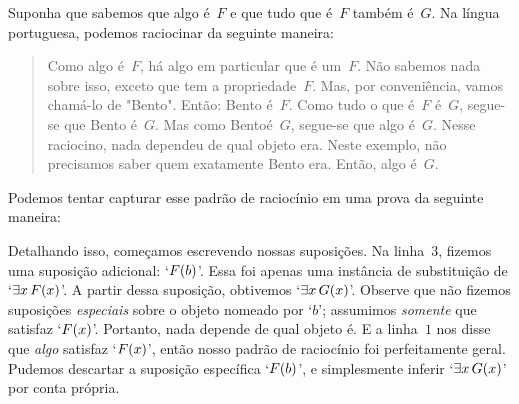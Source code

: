  Suponha que sabemos que algo \'e~$F$ e que tudo que \'e~$F$ tamb\'em \'e~$G$. Na l\'ingua portuguesa, podemos raciocinar da seguinte maneira:
	\begin{quote}
		Como algo \'e~$F$, h\'a algo em particular que \'e um~$F$. N\~ao sabemos nada sobre isso, exceto que tem a propriedade~$F$.  Mas, por conveni\^encia, vamos cham\'a-lo de "Bento". Ent\~ao: Bento \'e~$F$. Como tudo o que \'e~$F$ \'e~$G$, segue-se que Bento \'e~$G$. Mas como Bento\'e~$G$, segue-se que algo \'e~$G$. Nesse raciocino,  nada dependeu  de qual objeto era. Neste exemplo, n\~ao precisamos saber quem exatamente Bento era.   Ent\~ao, algo \'e~$G$.
	\end{quote}
 Podemos tentar capturar esse padr\~ao de racioc\'inio em uma prova da seguinte maneira:
\begin{fitchproof}
	\open
		 
	\close
\end{fitchproof}\noindent
Detalhando isso, come\c camos escrevendo nossas suposi\c c\~oes. Na linha~$3$, fizemos uma suposi\c c\~ao adicional: `$\mathord{F}(b)$'. Essa foi apenas uma inst\^ancia de substitui\c c\~ao de `$\exists x\,\mathord{F}(x)$'. A partir dessa suposi\c c\~ao, obtivemos `$\exists x\,\mathord{G}(x)$'. Observe que n\~ao fizemos suposi\c c\~oes \emph{especiais} sobre o objeto nomeado por `$b$'; assumimos \emph{somente} que satisfaz `$\mathord{F}(x)$'. Portanto, nada depende de qual objeto \'e. E a linha~$1$ nos disse que \emph{algo} satisfaz `$\mathord{F}(x)$', ent\~ao nosso padr\~ao de racioc\'inio foi perfeitamente geral. Pudemos descartar a suposi\c c\~ao espec\'ifica `$\mathord{F}(b)$', e simplesmente inferir `$\exists x\,\mathord{G}(x)$' por conta pr\'opria.
 

